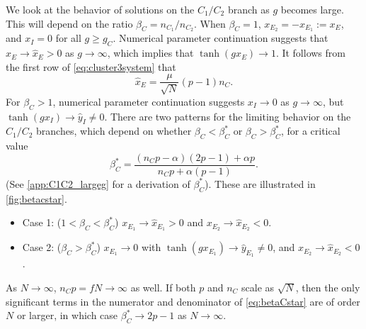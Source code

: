 \documentclass[reqno]{siamonline190516}
\begin{document}
We look at the behavior of solutions on the $C_1/C_2$ branch as $g$ becomes large. This will depend on the ratio $\beta_C = n_{C_1}/n_{C_2}$. When $\beta_C = 1$, $x_{E_2} = -x_{E_1} := x_E$, and $x_I = 0$ for all $g \geq g_C$. Numerical parameter continuation suggests that $x_{E} \rightarrow \hat{x}_{E} > 0$ as $g \rightarrow \infty$, which implies that $\tanh(g x_{E}) \rightarrow 1$. It follows from the first row of \cref{eq:cluster3system} that 
\begin{equation}\label{eq:xEhat}
\hat{x}_{E} = \frac{\mu}{\sqrt{N}}(p-1)n_C.
\end{equation}
For $\beta_C > 1$, numerical parameter continuation suggests $x_I \rightarrow 0$ as $g \rightarrow \infty$, but $\tanh(g x_I) \rightarrow \hat{y}_I \neq 0$. There are two patterns for the limiting behavior on the $C_1/C_2$ branches, which depend on whether $\beta_C < \beta_C^*$ or $\beta_C > \beta_C^*$, for a critical value
\begin{equation}\label{eq:betaCstar}
    \beta_C^* = \frac{(n_C p - \alpha )(2 p - 1) + \alpha p}{n_C p + \alpha(p-1)}.
\end{equation}
(See \cref{app:C1C2_largeg} for a derivation of $\beta_C^*$). These are illustrated in \cref{fig:betacstar}.
\begin{itemize}
    \item Case 1: ($1 < \beta_C < \beta_C^*$) $x_{E_1} \rightarrow \hat{x}_{E_1} > 0$ and $x_{E_2} \rightarrow \hat{x}_{E_2} < 0$. 
    \item Case 2: ($\beta_C > \beta_C^*$) $x_{E_1} \rightarrow 0$ with $\tanh(g x_{E_1}) \rightarrow \hat{y}_{E_1} \neq 0$, and $x_{E_2} \rightarrow \hat{x}_{E_2} < 0$.\\
\end{itemize}
As $N \rightarrow \infty$, $n_C p = f N \rightarrow \infty$ as well. If both $p$ and $n_C$ scale as $\sqrt{N}$, then the only significant terms in the numerator and denominator of \cref{eq:betaCstar} are of order $N$ or larger, in which case $\beta_C^* \rightarrow 2 p-1$ as $N \rightarrow \infty$. 
\end{document}
